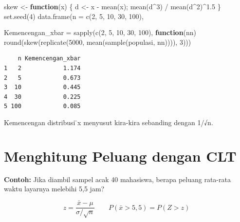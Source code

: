\documentclass[
  indonesian,
  letterpaper,
]{book}
\newenvironment{Shaded}{\begin{snugshade}}{\end{snugshade}}
\newcommand{\AttributeTok}[1]{\textcolor[rgb]{0.40,0.45,0.13}{#1}}
\newcommand{\ControlFlowTok}[1]{\textcolor[rgb]{0.00,0.23,0.31}{\textbf{#1}}}
\newcommand{\DecValTok}[1]{\textcolor[rgb]{0.68,0.00,0.00}{#1}}
\newcommand{\FloatTok}[1]{\textcolor[rgb]{0.68,0.00,0.00}{#1}}
\newcommand{\FunctionTok}[1]{\textcolor[rgb]{0.28,0.35,0.67}{#1}}
\newcommand{\NormalTok}[1]{\textcolor[rgb]{0.00,0.23,0.31}{#1}}
\newcommand{\OtherTok}[1]{\textcolor[rgb]{0.00,0.23,0.31}{#1}}
\newcommand{\SpecialCharTok}[1]{\textcolor[rgb]{0.37,0.37,0.37}{#1}}
\begin{document}
\begin{Shaded}
\begin{Highlighting}[]
\NormalTok{skew }\OtherTok{\textless{}{-}} \ControlFlowTok{function}\NormalTok{(x) \{ d }\OtherTok{\textless{}{-}}\NormalTok{ x }\SpecialCharTok{{-}} \FunctionTok{mean}\NormalTok{(x); }\FunctionTok{mean}\NormalTok{(d}\SpecialCharTok{\^{}}\DecValTok{3}\NormalTok{) }\SpecialCharTok{/} \FunctionTok{mean}\NormalTok{(d}\SpecialCharTok{\^{}}\DecValTok{2}\NormalTok{)}\SpecialCharTok{\^{}}\FloatTok{1.5}\NormalTok{ \}}
\FunctionTok{set.seed}\NormalTok{(}\DecValTok{4}\NormalTok{)}
\FunctionTok{data.frame}\NormalTok{(}\AttributeTok{n =} \FunctionTok{c}\NormalTok{(}\DecValTok{2}\NormalTok{, }\DecValTok{5}\NormalTok{, }\DecValTok{10}\NormalTok{, }\DecValTok{30}\NormalTok{, }\DecValTok{100}\NormalTok{),}

\AttributeTok{Kemencengan\_xbar =} \FunctionTok{sapply}\NormalTok{(}\FunctionTok{c}\NormalTok{(}\DecValTok{2}\NormalTok{, }\DecValTok{5}\NormalTok{, }\DecValTok{10}\NormalTok{, }\DecValTok{30}\NormalTok{, }\DecValTok{100}\NormalTok{), }\ControlFlowTok{function}\NormalTok{(nn)}
\FunctionTok{round}\NormalTok{(}\FunctionTok{skew}\NormalTok{(}\FunctionTok{replicate}\NormalTok{(}\DecValTok{5000}\NormalTok{, }\FunctionTok{mean}\NormalTok{(}\FunctionTok{sample}\NormalTok{(populasi, nn)))), }\DecValTok{3}\NormalTok{)))}
\end{Highlighting}
\end{Shaded}

\begin{verbatim}
    n Kemencengan_xbar
1   2            1.174
2   5            0.673
3  10            0.445
4  30            0.225
5 100            0.085
\end{verbatim}

Kemencengan distribusi ̄x menyusut kira-kira sebanding dengan 1/√n.

\section{Menghitung Peluang dengan
CLT}\label{menghitung-peluang-dengan-clt}

\textbf{Contoh:} Jika diambil sampel acak 40 mahasiswa, berapa peluang
rata-rata waktu layarnya melebihi 5,5 jam?

\[z = \frac{\bar{x} - \mu}{\sigma/\sqrt{n}} \qquad P(\bar{x} > 5{,}5) = P(Z > z)\]
\end{document}
